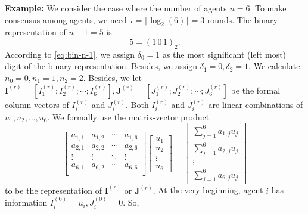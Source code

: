 \documentclass{article}
\newcommand{\vI}{\mathbf{I}}
\newcommand{\vJ}{\mathbf{J}}
\newcommand{\ro}{{(r)}}
\theoremstyle{plain}
\theoremstyle{definition}
\begin{document}
\textbf{Example: }We consider the case where the number of agents $n=6$. To make consensus among agents, we need $\tau=\lceil \log_2(6)\rceil=3$ rounds. The binary representation of $n-1=5$ is
$$
5=(1\,0\,1)_2.
$$
According to \eqref{eq:bin-n-1}, we assign $\delta_0=1$ as the most significant (left most) digit of the binary representation. {Besides, we assign $\delta_1=0, \delta_2=1$. We calculate $n_0=0, n_1=1, n_2=2$. Besides, we let $\vI^\ro=[I^\ro_1;I^\ro_2;\cdots;I^\ro_6], \vJ^\ro=[J^\ro_1;J^\ro_2;\cdots;J^\ro_6]$ be the formal column vectors of $I^\ro_i$ and $J^\ro_i$. Both $I^\ro_i$ and $J^\ro_i$ are linear combinations of $u_1,u_2,\ldots,u_6$. We formally use the matrix-vector product 
$$
\left[
\begin{array}{cccc}
    a_{1,1} & a_{1,2} & \cdots & a_{1,6} \\
    a_{2,1} & a_{2,2} & \cdots & a_{2,6} \\
    \vdots  & \vdots  & \ddots & \vdots  \\
    a_{6,1} & a_{6,2} & \cdots & a_{6,6} \\
\end{array}
\right]
\left[
\begin{array}{c}
     u_1  \\
     u_2  \\
     \vdots\\
     u_6
\end{array}
\right]
=
\left[
\begin{array}{c}
     \sum_{j=1}^6 a_{1,j}u_j  \\
     \sum_{j=1}^6 a_{2,j}u_j  \\
     \vdots\\
     \sum_{j=1}^6 a_{6,j}u_j
\end{array}
\right]
$$
to be the representation of $\vI^\ro$ or $\vJ^\ro$.} At the very beginning, agent $i$ has information $I^{(0)}_i=u_i, J^{(0)}_i=0$. So,
\end{document}
